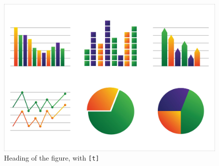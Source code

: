 \documentclass[12pt,green,palatino]{../bppaper}
\begin{document}
\blindtext
\begin{figure}[t]
\centering
\caption{Heading of the figure, with \texttt{[t]}}
\includegraphics[width=0.8\linewidth]{graph}
\end{figure}
\blindtext
\end{document}
